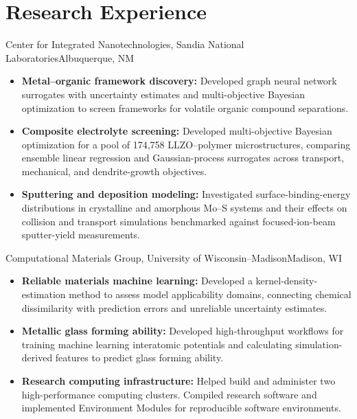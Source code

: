 \section{Research Experience}

    {Center for Integrated Nanotechnologies, Sandia National Laboratories}{Albuquerque, NM}
\begin{itemize}
    \item \textbf{Metal--organic framework discovery:} Developed graph neural network surrogates with uncertainty estimates and multi-objective Bayesian optimization to screen frameworks for volatile organic compound separations.
    \item \textbf{Composite electrolyte screening:} Developed multi-objective Bayesian optimization for a pool of 174,758 LLZO--polymer microstructures, comparing ensemble linear regression and Gaussian-process surrogates across transport, mechanical, and dendrite-growth objectives.
    \item \textbf{Sputtering and deposition modeling:} Investigated surface-binding-energy distributions in crystalline and amorphous Mo--S systems and their effects on collision and transport simulations benchmarked against focused-ion-beam sputter-yield measurements.
\end{itemize}

    {Computational Materials Group, University of Wisconsin--Madison}{Madison, WI}
\begin{itemize}
    \item \textbf{Reliable materials machine learning:} Developed a kernel-density-estimation method to assess model applicability domains, connecting chemical dissimilarity with prediction errors and unreliable uncertainty estimates.
    \item \textbf{Metallic glass forming ability:} Developed high-throughput workflows for training machine learning interatomic potentials and calculating simulation-derived features to predict glass forming ability.
    \item \textbf{Research computing infrastructure:} Helped build and administer two high-performance computing clusters. Compiled research software and implemented Environment Modules for reproducible software environments.
\end{itemize}
